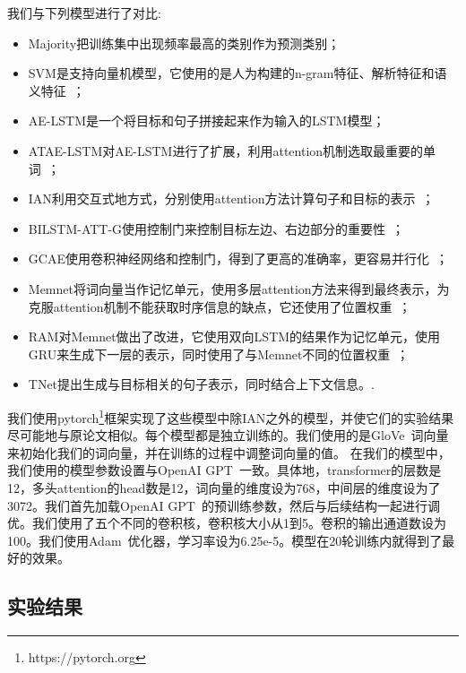 我们与下列模型进行了对比:
\begin{itemize}
    \item Majority把训练集中出现频率最高的类别作为预测类别；
    \item SVM是支持向量机模型，它使用的是人为构建的n-gram特征、解析特征和语义特征~\cite{kiritchenko2014nrc-canada-2014:}；
    \item AE-LSTM是一个将目标和句子拼接起来作为输入的LSTM模型；
    \item ATAE-LSTM对AE-LSTM进行了扩展，利用attention机制选取最重要的单词~\cite{wang2016attention-based}；
    \item IAN利用交互式地方式，分别使用attention方法计算句子和目标的表示~\cite{ma2017interactive}；
    \item BILSTM-ATT-G使用控制门来控制目标左边、右边部分的重要性~\cite{liu2017attention}；
    \item GCAE使用卷积神经网络和控制门，得到了更高的准确率，更容易并行化~\cite{xue2018aspect}；
    \item {Memnet}将词向量当作记忆单元，使用多层attention方法来得到最终表示，为克服attention机制不能获取时序信息的缺点，它还使用了位置权重~\cite{tang2016aspect}；
    \item RAM对Memnet做出了改进，它使用双向LSTM的结果作为记忆单元，使用GRU来生成下一层的表示，同时使用了与Memnet不同的位置权重~\cite{Al2017Deep}；
    \item TNet提出生成与目标相关的句子表示，同时结合上下文信息。\cite{Xin2018Transformation}.
\end{itemize}
我们使用pytorch\footnote{https://pytorch.org}框架实现了这些模型中除IAN之外的模型，并使它们的实验结果尽可能地与原论文相似。每个模型都是独立训练的。我们使用的是GloVe~\cite{pennington2014glove}词向量来初始化我们的词向量，并在训练的过程中调整词向量的值。
在我们的模型中，我们使用的模型参数设置与OpenAI GPT~\cite{radford2018improving}一致。具体地，transformer的层数是12，多头attention的head数是12，词向量的维度设为768，中间层的维度设为了3072。我们首先加载OpenAI GPT~\cite{radford2018improving}的预训练参数，然后与后续结构一起进行调优。我们使用了五个不同的卷积核，卷积核大小从1到5。卷积的输出通道数设为100。我们使用Adam~\cite{kingma2014adam}优化器，学习率设为6.25e-5。模型在20轮训练内就得到了最好的效果。
\subsection{实验结果}

